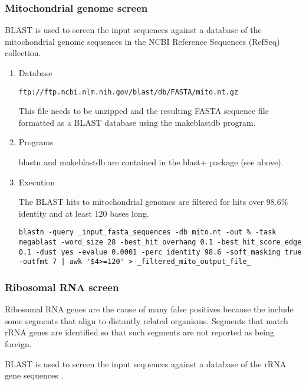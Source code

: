 \documentclass[11pt]{article}
\begin{document}
\subsubsection{Mitochondrial genome screen}
\label{sec:orgd107b26}


BLAST is used to screen the input sequences against a database of the
mitochondrial genome sequences in the NCBI Reference Sequences (RefSeq)
collection.

\begin{enumerate}
\item Database
\label{sec:org5ab5637}


\begin{verbatim}
ftp://ftp.ncbi.nlm.nih.gov/blast/db/FASTA/mito.nt.gz
\end{verbatim}

This file needs to be unzipped and the resulting FASTA sequence file
formatted as a BLAST database using the makeblastdb program.

\item Programs
\label{sec:org4d62bae}


blastn and makeblastdb are contained in the blast+ package (see above).

\item Execution
\label{sec:orge6cd904}


The BLAST hits to mitochondrial genomes are filtered for hits over 98.6\%
identity and at least 120 bases long.

\begin{verbatim}
blastn -query _input_fasta_sequences -db mito.nt -out % -task megablast -word_size 28 -best_hit_overhang 0.1 -best_hit_score_edge 0.1 -dust yes -evalue 0.0001 -perc_identity 98.6 -soft_masking true -outfmt 7 | awk '$4>=120' > _filtered_mito_output_file_
\end{verbatim}
\end{enumerate}

\subsubsection{Ribosomal RNA screen}
\label{sec:org99d1528}

Ribosomal RNA genes are the cause of many false positives because the
include some segments that align to distantly related organisms.
Segments that match rRNA genes are identified so that such segments are
not reported as being foreign.

BLAST is used to screen the input sequences against a database of the
rRNA gene sequences .
\end{document}

